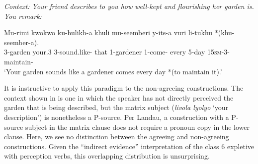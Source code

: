 \documentclass[output=paper,colorlinks,citecolor=brown
]{langscibook}
\begin{document}
\ea\label{ex:johnson:GardenSoundsCopyRequired}  \textit{Context: Your friend describes to you how well-kept and flourishing her garden is. You remark:} 


\gll Mu-rimi kwokwo ku-hulikh-a khuli mu-seemberi y-its-a vuri li-tukhu *(khu-seember-a).\\
3-garden your.3 3\Sm-sound.like-\Fv{} that 1-gardener 1\Sm-come-\Fv{} every 5-day \phantom{*(}15\textsc{sm}-3\Om-maintain-\Fv{} \\
\glt `Your garden sounds like a gardener comes every day *(to maintain it).'



\z

It is instructive to apply this paradigm to the non-agreeing constructions. The context shown in  is one in which the speaker has not directly perceived the garden that is being described, but the matrix subject (\textit{livola lyolyo} `your description') is nonetheless a P-source. Per Landau, a construction with a P-source subject in the matrix clause does not require a pronoun copy in the lower clause. Here, we see no distinction between the agreeing  and non-agreeing  constructions. Given the ``indirect evidence'' interpretation of the class 6 expletive with perception verbs, this overlapping distribution is unsurprising.
\end{document}
